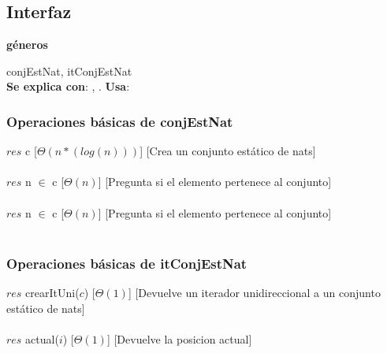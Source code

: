 
\subsection{Interfaz}

   \parbox{1.7cm}{\textbf{g\'eneros}} conjEstNat, itConjEstNat\\

  \textbf{Se explica con}: , .
  \textbf{Usa}: \

  \subsubsection{Operaciones b\'asicas de conjEstNat}
  {$res$ \igobs c}
  [$\Theta(n*(log (n)))$]
  [Crea un conjunto est\'atico de nats]\\\\
  
  {$res$ \igobs n $\in$ c}
  [$\Theta(n)$]
  [Pregunta si el elemento pertenece al conjunto]\\\\

  {$res$ \igobs n $\in$ c}
  [$\Theta(n)$]
  [Pregunta si el elemento pertenece al conjunto]\\\\  
  \subsubsection{Operaciones b\'asicas de itConjEstNat}  
  
  {$res$ \igobs crearItUni($c$)}
  [$\Theta(1)$]
  [Devuelve un iterador unidireccional a un conjunto est\'atico de nats]\\\\
  
  {$res$ \igobs actual($i$)}
  [$\Theta(1)$]
  [Devuelve la posicion actual]\\\\
  
